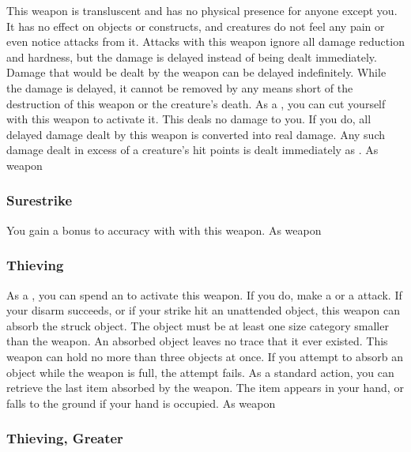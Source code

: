 This weapon is transluscent and has no physical presence for anyone except you.
It has no effect on objects or constructs, and creatures do not feel any pain or even notice attacks from it.
Attacks with this weapon ignore all damage reduction and hardness, but the damage is delayed instead of being dealt immediately.
Damage that would be dealt by the weapon can be delayed indefinitely.
While the damage is delayed, it cannot be removed by any means short of the destruction of this weapon or the creature's death.
As a , you can cut yourself with this weapon to activate it.
This deals no damage to you.
If you do, all delayed damage dealt by this weapon is converted into real damage.
Any such damage dealt in excess of a creature's hit points is dealt immediately as .
 As weapon
\lowercase{\hypertarget{item:Surestrike}{}}\label{item:Surestrike}
\hypertarget{item:Surestrike}{\subsubsection{Surestrike\hfill{}}}
You gain a  bonus to accuracy with  with this weapon.
 
 As weapon
\lowercase{\hypertarget{item:Thieving}{}}\label{item:Thieving}
\hypertarget{item:Thieving}{\subsubsection{Thieving\hfill{}}}
As a , you can spend an  to activate this weapon.
If you do, make a  or a  attack.
If your disarm succeeds, or if your strike hit an unattended object, this weapon can absorb the struck object.
The object must be at least one size category smaller than the weapon.
An absorbed object leaves no trace that it ever existed.
This weapon can hold no more than three objects at once.
If you attempt to absorb an object while the weapon is full, the attempt fails.
As a standard action, you can retrieve the last item absorbed by the weapon.
The item appears in your hand, or falls to the ground if your hand is occupied.
 
 As weapon
\lowercase{\hypertarget{item:Thieving, Greater}{}}\label{item:Thieving, Greater}
\hypertarget{item:Thieving, Greater}{\subsubsection{Thieving, Greater\hfill{}}}
